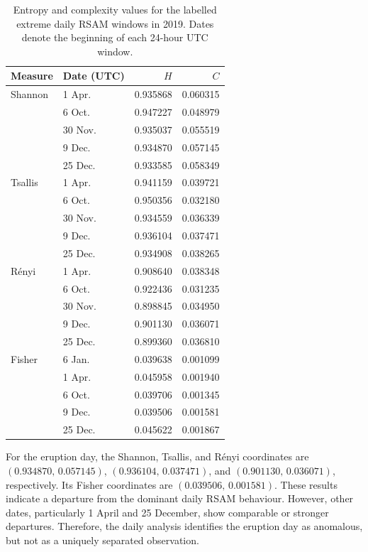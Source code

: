 \documentclass[12pt,a4paper]{article}
\begin{document}
\begin{table}[H]
	\centering
	\caption{Entropy and complexity values for the labelled extreme daily
		RSAM windows in 2019. Dates denote the beginning of each 24-hour UTC
		window.}
	\label{tab:daily-extreme-points}
	\small
	\begin{tabular}{llrr}
		\toprule
		Measure & Date (UTC) & \(H\) & \(C\) \\
		\midrule
		Shannon & 1 Apr.  & 0.935868 & 0.060315 \\
		& 6 Oct.  & 0.947227 & 0.048979 \\
		& 30 Nov. & 0.935037 & 0.055519 \\
		& 9 Dec.  & 0.934870 & 0.057145 \\
		& 25 Dec. & 0.933585 & 0.058349 \\
		\midrule
		Tsallis & 1 Apr.  & 0.941159 & 0.039721 \\
		& 6 Oct.  & 0.950356 & 0.032180 \\
		& 30 Nov. & 0.934559 & 0.036339 \\
		& 9 Dec.  & 0.936104 & 0.037471 \\
		& 25 Dec. & 0.934908 & 0.038265 \\
		\midrule
		R\'enyi & 1 Apr.  & 0.908640 & 0.038348 \\
		& 6 Oct.  & 0.922436 & 0.031235 \\
		& 30 Nov. & 0.898845 & 0.034950 \\
		& 9 Dec.  & 0.901130 & 0.036071 \\
		& 25 Dec. & 0.899360 & 0.036810 \\
		\midrule
		Fisher  & 6 Jan.  & 0.039638 & 0.001099 \\
		& 1 Apr.  & 0.045958 & 0.001940 \\
		& 6 Oct.  & 0.039706 & 0.001345 \\
		& 9 Dec.  & 0.039506 & 0.001581 \\
		& 25 Dec. & 0.045622 & 0.001867 \\
		\bottomrule
	\end{tabular}
\end{table}

For the eruption day, the Shannon, Tsallis, and R\'enyi coordinates are \((0.934870,\,0.057145)\), \((0.936104,\,0.037471)\), and \((0.901130,\,0.036071)\), respectively. Its Fisher coordinates are \((0.039506,\,0.001581)\). These results indicate a departure from the dominant daily RSAM behaviour. However, other dates, particularly 1 April and 25 December, show comparable or stronger departures. Therefore, the daily analysis identifies the eruption day as anomalous, but not as a uniquely separated observation.
\end{document}
